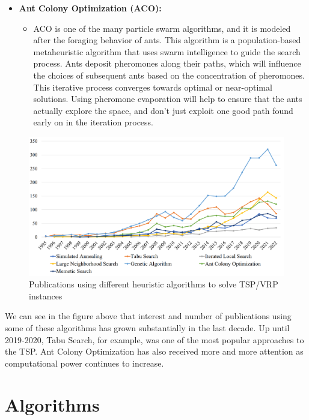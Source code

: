 \documentclass{article}
\begin{document}
\begin{itemize}
    \item \textbf{Ant Colony Optimization (ACO):}   
    \begin{itemize}
        \item ACO is one of the many particle swarm algorithms, and it is modeled after the foraging behavior of ants. This algorithm is a population-based metaheuristic algorithm that uses swarm intelligence to guide the search process. Ants deposit pheromones along their paths, which will influence the choices of subsequent ants based on the concentration of pheromones. This iterative process converges towards optimal or near-optimal solutions. Using pheromone evaporation will help to ensure that the ants actually explore the space, and don't just exploit one good path found early on in the iteration process.
    \end{itemize}
\end{itemize}

\begin{figure}[h]
    \centering
    \includegraphics[width=\textwidth,keepaspectratio]{TSPAlgs.PNG}
    \caption{Publications using different heuristic algorithms to solve TSP/VRP instances}
    \label{fig:algsOverTime}
\end{figure}

\noindent We can see in the figure above that interest and number of publications using some of these algorithms has grown substantially in the last decade. Up until 2019-2020, Tabu Search, for example, was one of the most popular approaches to the TSP. Ant Colony Optimization has also received more and more attention as computational power continues to increase. 


\section{Algorithms}
\end{document}
